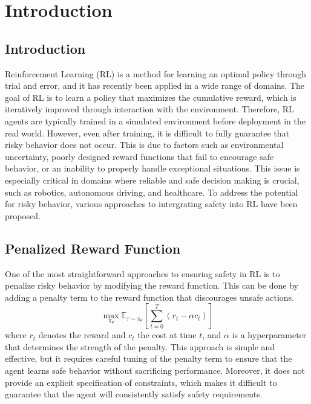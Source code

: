 

\chapter{Introduction}\label{chapter1}
\section{Introduction} \label{chap1:sec1}

Reinforcement Learning (RL) is a method for learning an optimal policy through trial and error, and it has recently been applied in a wide range of domains.
The goal of RL is to learn a policy that maximizes the cumulative reward, which is iteratively improved through interaction with the environment.
Therefore, RL agents are typically trained in a simulated environment before deployment in the real world.
However, even after training, it is difficult to fully guarantee that risky behavior does not occur.
This is due to factors such as environmental uncertainty, poorly designed reward functions that fail to encourage safe behavior, or an inability to properly handle exceptional situations.
This issue is especially critical in domains where reliable and safe decision making is crucial, such as robotics, autonomous driving, and healthcare.
To address the potential for risky behavior, various approaches to intergrating safety into RL have been proposed.

\section{Penalized Reward Function}

One of the most straightforward approaches to ensuring safety in RL is to penalize risky behavior by modifying the reward function.
This can be done by adding a penalty term to the reward function that discourages unsafe actions. \cite{RCPO}
\begin{equation}
    \max_{\pi_\theta} \mathbb{E}_{\tau \sim \pi_\theta}\left[\sum^T_{t = 0} (r_t - \alpha c_t) \right]
\end{equation}
where $r_t$ denotes the reward and $c_t$ the cost at time $t$, and $\alpha$ is a hyperparameter that determines the strength of the penalty.
This approach is simple and effective, but it requires careful tuning of the penalty term to ensure that the agent learns safe behavior without sacrificing performance.
Moreover, it does not provide an explicit specification of constraints, which makes it difficult to guarantee that the agent will consistently satisfy safety requirements.

